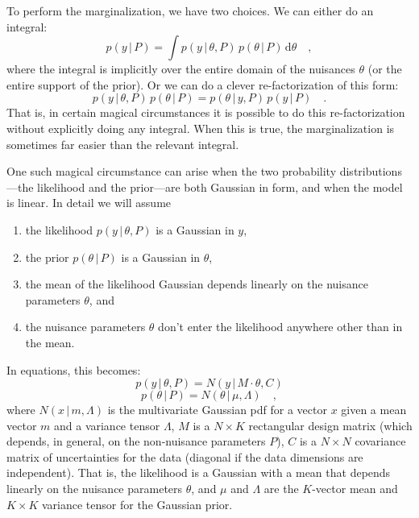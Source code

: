 \documentclass[12pt, letterpaper]{article}
\newcommand{\given}{\,|\,}
\newcommand{\dd}{\mathrm{d}}
\begin{document}
To perform the marginalization, we have two choices.
We can either do an integral:
\begin{equation}
p(y\given P) = \int p(y\given\theta, P)\,p(\theta\given P)\,\dd\theta
\quad ,
\end{equation}
where the integral is implicitly over the entire domain of the
nuisances $\theta$ (or the entire support of the prior).
Or we can do a clever re-factorization of this form:
\begin{equation}
p(y\given\theta,P)\,p(\theta\given P)
 = p(\theta\given y,P)\,p(y\given P)
\quad .
\end{equation}
That is, in certain magical circumstances it is possible to do this
re-factorization without explicitly doing any integral.
When this is true, the marginalization is sometimes far easier than
the relevant integral.

One such magical circumstance can arise when the two probability
distributions---the likelihood and the prior---are both Gaussian in
form, and when the model is linear.
In detail we will assume
\begin{enumerate}
\item
the likelihood $p(y\given\theta, P)$ is a Gaussian in $y$,
\item
the prior $p(\theta\given P)$ is a Gaussian in $\theta$,
\item
the mean of the likelihood Gaussian depends linearly on the nuisance
parameters $\theta$, and
\item
the nuisance parameters $\theta$ don't enter the likelihood anywhere
other than in the mean.
\end{enumerate}
In equations, this becomes:
\begin{equation}
p(y\given\theta, P) = N(y\given M\cdot\theta, C)
\end{equation}
\begin{equation}
p(\theta\given P) = N(\theta\given \mu, \Lambda)
\quad ,
\end{equation}
where
$N(x\given m,\Lambda)$ is the multivariate Gaussian pdf for a vector $x$
given a mean vector $m$ and a variance tensor $\Lambda$,
$M$ is a $N\times K$ rectangular design matrix (which depends, in
general, on the non-nuisance parameters $P$),
$C$ is a $N\times N$ covariance matrix of uncertainties for the
data (diagonal if the data dimensions are independent).
That is, the likelihood is a Gaussian with a mean that depends
linearly on the nuisance parameters $\theta$, and
$\mu$ and $\Lambda$ are the $K$-vector mean and $K\times K$ variance tensor
for the Gaussian prior.
\end{document}
